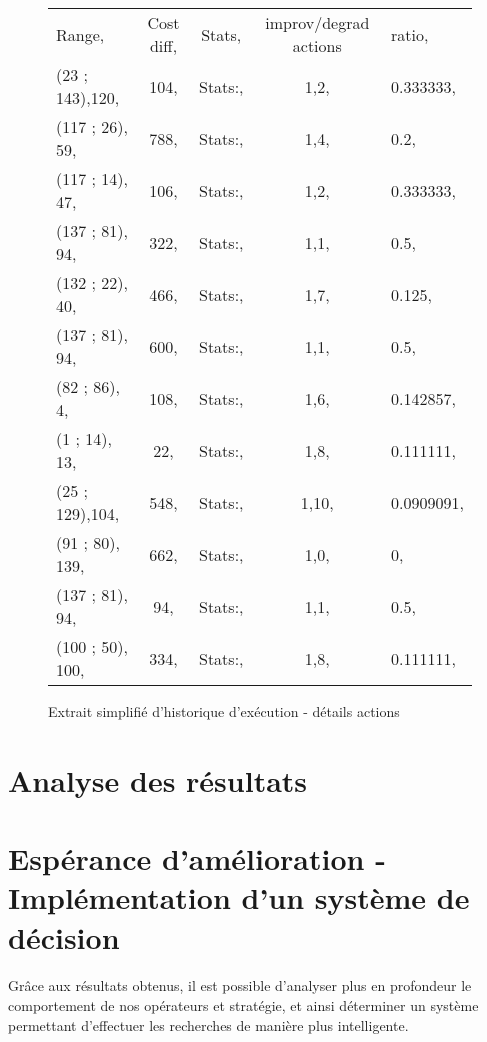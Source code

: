 \documentclass[a4paper,10pt]{report}
\begin{document}
\begin{figure}[h]
  \begin{tabular}{lcccl}
    Range,		&Cost diff,	
				&Stats,	&improv/degrad actions	&ratio,\\
    (23  ; 143),120,	&104,	&Stats:,	&1,2,		&0.333333,\\
    (117 ; 26),  59,	&788,	&Stats:,	&1,4,		&0.2,\\
    (117 ; 14),  47,	&106,	&Stats:,	&1,2,		&0.333333,\\
    (137 ; 81),  94,	&322,	&Stats:,	&1,1,		&0.5,\\
    (132 ; 22),  40,	&466,	&Stats:,	&1,7,		&0.125,\\
    (137 ; 81),  94,	&600,	&Stats:,	&1,1,		&0.5,\\
    (82  ; 86),   4,	&108,	&Stats:,	&1,6,		&0.142857,\\
    (1   ; 14),  13,	&22,	&Stats:,	&1,8,		&0.111111,\\
    (25  ; 129),104,	&548,	&Stats:,	&1,10,		&0.0909091,\\
    (91  ; 80), 139,	&662,	&Stats:,	&1,0,		&0,\\
    (137 ; 81),  94,	&94,	&Stats:,	&1,1,		&0.5,\\
    (100 ; 50), 100,	&334,	&Stats:,	&1,8,		&0.111111,\\
  \end{tabular}
  \label{a280-sample-interval-simple-bis}
  \caption{Extrait simplifié d'historique d'exécution - détails actions}
\end{figure}


\pagebreak
\section{Analyse des résultats}


\section{Espérance d'amélioration - Implémentation d'un système de décision}

\paragraph{}
  Grâce aux résultats obtenus, il est possible d'analyser plus en profondeur le
comportement de nos opérateurs et stratégie, et ainsi déterminer un système
permettant d'effectuer les recherches de manière plus intelligente.
\end{document}
